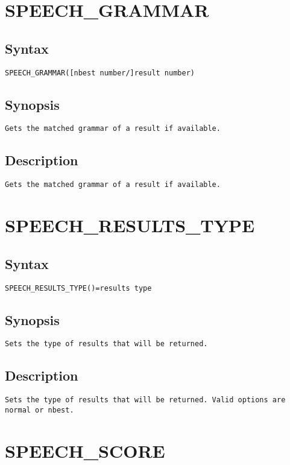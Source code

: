 \section{SPEECH\_GRAMMAR}
\subsection{Syntax}
\begin{verbatim}
SPEECH_GRAMMAR([nbest number/]result number)
\end{verbatim}
\subsection{Synopsis}
\begin{verbatim}
Gets the matched grammar of a result if available.
\end{verbatim}
\subsection{Description}
\begin{verbatim}
Gets the matched grammar of a result if available.

\end{verbatim}


\section{SPEECH\_RESULTS\_TYPE}
\subsection{Syntax}
\begin{verbatim}
SPEECH_RESULTS_TYPE()=results type
\end{verbatim}
\subsection{Synopsis}
\begin{verbatim}
Sets the type of results that will be returned.
\end{verbatim}
\subsection{Description}
\begin{verbatim}
Sets the type of results that will be returned. Valid options are normal or nbest.
\end{verbatim}


\section{SPEECH\_SCORE}
